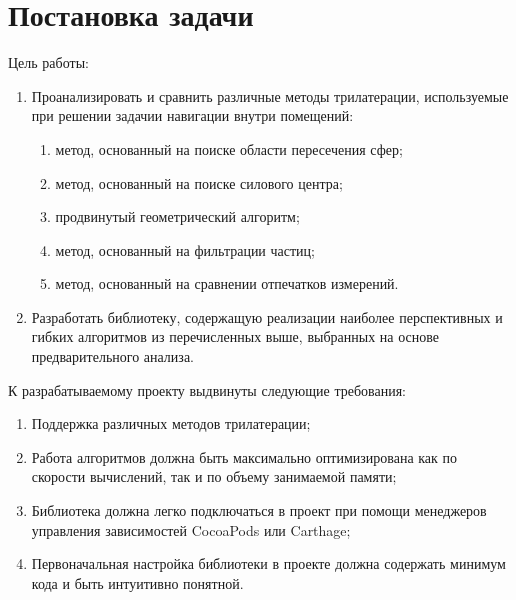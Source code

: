 \section{Постановка задачи}

Цель работы:
\begin{enumerate}
    \item
    Проанализировать и сравнить различные методы трилатерации, используемые при решении задачии навигации внутри помещений:
    \begin{enumerate}
        \item
        метод, основанный на поиске области пересечения сфер;
        \item
        метод, основанный на поиске силового центра;
        \item
        продвинутый геометрический алгоритм;
        \item
        метод, основанный на фильтрации частиц;
        \item
        метод, основанный на сравнении отпечатков измерений.
    \end{enumerate}
    \item
    Разработать библиотеку, содержащую реализации наиболее перспективных и гибких алгоритмов из перечисленных выше, выбранных на основе предварительного анализа.
\end{enumerate}

К разрабатываемому проекту выдвинуты следующие требования:
\begin{enumerate}
    \item
    Поддержка различных методов трилатерации;
    \item
    Работа алгоритмов должна быть максимально оптимизирована как по скорости вычислений, так и по объему занимаемой памяти;
    \item
    Библиотека должна легко подключаться в проект при помощи менеджеров управления зависимостей CocoaPods или Carthage;
    \item
    Первоначальная настройка библиотеки в проекте должна содержать минимум кода и быть интуитивно понятной.
\end{enumerate}